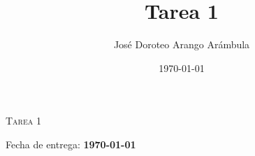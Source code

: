 \documentclass[10pt,oneside]{article}
\author{José Doroteo Arango Arámbula} %
\title{Tarea 1}
\date{\today}
\begin{document}
\begin{center}
{\large \textsc{Tarea 1} }
\end{center}
\begin{flushright}
Fecha de entrega: \textbf{\today}
\end{flushright}
\thispagestyle{fancy} %

\nocite{Ross2012}
\printbibliography
\end{document}
